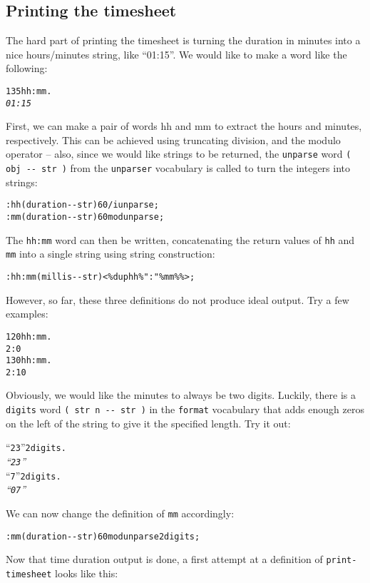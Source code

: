 \documentclass[english]{article}
\begin{document}
\subsection{Printing the timesheet}

The hard part of printing the timesheet is turning the duration in
minutes into a nice hours/minutes string, like {}``01:15''. We would
like to make a word like the following:

\begin{alltt}
135 hh:mm .
\emph{01:15}
\end{alltt}

First, we can make a pair of words hh and mm to extract the hours
and minutes, respectively. This can be achieved using truncating division,
and the modulo operator -- also, since we would like strings to be
returned, the \texttt{unparse} word \texttt{( obj -{}- str )} from
the \texttt{unparser} vocabulary is called to turn the integers into
strings:

\begin{alltt}
: hh ( duration -{}- str ) 60 /i unparse ;
: mm ( duration -{}- str ) 60 mod unparse ;
\end{alltt}

The \texttt{hh:mm} word can then be written, concatenating the return
values of \texttt{hh} and \texttt{mm} into a single string using string
construction:

\begin{alltt}
: hh:mm ( millis -{}- str ) <\% dup hh \% ":" \% mm \% \%> ;
\end{alltt}
However, so far, these three definitions do not produce ideal output.
Try a few examples:

\begin{alltt}
120 hh:mm .
2:0
130 hh:mm .
2:10
\end{alltt}
Obviously, we would like the minutes to always be two digits. Luckily,
there is a \texttt{digits} word \texttt{( str n -{}- str )} in the
\texttt{format} vocabulary that adds enough zeros on the left of the
string to give it the specified length. Try it out:

\begin{alltt}
{}``23'' 2 digits .
\emph{{}``23''}
{}``7'' 2 digits .
\emph{{}``07''}
\end{alltt}
We can now change the definition of \texttt{mm} accordingly:

\begin{alltt}
: mm ( duration -{}- str ) 60 mod unparse 2 digits ;
\end{alltt}
Now that time duration output is done, a first attempt at a definition
of \texttt{print-timesheet} looks like this:
\end{document}
